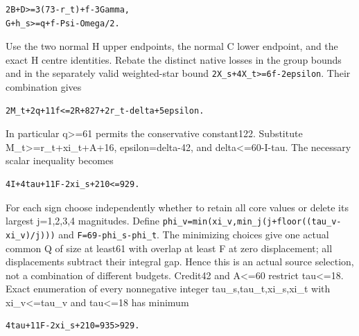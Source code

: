 \documentclass[10pt,a4paper]{article}
\theoremstyle{definition}
\begin{document}
\begin{lstlisting}
2B+D>=3(73-r_t)+f-3Gamma,
G+h_s>=q+f-Psi-Omega/2.
\end{lstlisting}

Use the two normal H upper endpoints,\allowbreak{} the normal C lower endpoint,\allowbreak{} and
the exact H centre identities. Rebate the distinct native losses in the
group bounds and in the separately valid weighted-star bound
\texttt{2X\_\allowbreak{}\allowbreak{}s+\allowbreak{}4X\_\allowbreak{}\allowbreak{}t>=\allowbreak{}6f-2epsilon}. Their combination
gives

\begin{lstlisting}
2M_t+2q+11f<=2R+827+2r_t-delta+5epsilon.
\end{lstlisting}

In particular q\textgreater=\allowbreak{}61 permits the conservative constant122.
Substitute M\_\allowbreak{}t\textgreater=\allowbreak{}r\_\allowbreak{}t+\allowbreak{}xi\_\allowbreak{}t+\allowbreak{}A+\allowbreak{}16,\allowbreak{} epsilon=\allowbreak{}delta-42,\allowbreak{} and
delta\textless=\allowbreak{}60-I-tau. The necessary scalar inequality becomes

\begin{lstlisting}
4I+4tau+11F-2xi_s+210<=929.
\end{lstlisting}

For each sign choose independently whether to retain all core values or
delete its largest j=\allowbreak{}1,\allowbreak{}2,\allowbreak{}3,\allowbreak{}4 magnitudes. Define
\texttt{phi\_\allowbreak{}\allowbreak{}v=\allowbreak{}min(xi\_\allowbreak{}\allowbreak{}v,\allowbreak{}min\_\allowbreak{}\allowbreak{}j(j+\allowbreak{}floor((tau\_\allowbreak{}\allowbreak{}v-xi\_\allowbreak{}\allowbreak{}v)/\allowbreak{}j)))}
and \texttt{F=\allowbreak{}69-phi\_\allowbreak{}\allowbreak{}s-phi\_\allowbreak{}\allowbreak{}t}. The minimizing choices
give one actual common Q of size at least61 with overlap at least F at
zero displacement; all displacements subtract their integral gap. Hence
this is an actual source selection,\allowbreak{} not a combination of different
budgets. Credit42 and A\textless=\allowbreak{}60 restrict tau\textless=\allowbreak{}18. Exact
enumeration of every nonnegative integer tau\_\allowbreak{}s,\allowbreak{}tau\_\allowbreak{}t,\allowbreak{}xi\_\allowbreak{}s,\allowbreak{}xi\_\allowbreak{}t with
xi\_\allowbreak{}v\textless=\allowbreak{}tau\_\allowbreak{}v and tau\textless=\allowbreak{}18 has minimum

\begin{lstlisting}
4tau+11F-2xi_s+210=935>929.
\end{lstlisting}
\end{document}
